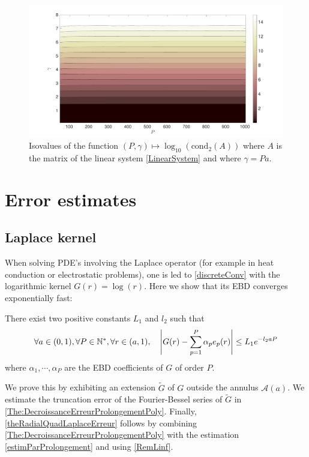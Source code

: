 \documentclass[main]{subfiles}
\begin{document}
\begin{figure}[t]
	\centering\includegraphics[scale = 0.15]{EBD/figs/isoValues-eps-converted-to}
	\caption{Isovalues of the function $(P,\gamma) \mapsto \log_{10} (\text{cond}_2(A))$ where $A$ is the matrix of the linear system \eqref{LinearSystem} and where $\gamma = Pa$. }
	\label{isoValues}
\end{figure}




\section{Error estimates}
\label{sec:ApplicationLaplaceHelmholtz}
\subsection{Laplace kernel}
When solving PDE's involving the Laplace operator (for example in heat conduction or electrostatic problems), one is led to \eqref{discreteConv} with the logarithmic kernel $G(r) = \log(r)$. Here we show that its EBD converges exponentially fast:
\begin{theorem} 
	\label{theRadialQuadLaplaceErreur}
	There exist two positive constants $L_1$ and $l_2$ such that
	\[ \forall a \in (0,1), \forall P \in \mathbb{N}^*, \forall r \in (a,1), \quad \left\lvert G(r) - \sum_{p=1}^P \alpha_p e_p(r) \right\rvert \leq L_1 e^{-l_2 a P} \]
	where $\alpha_1,\cdots,\alpha_P$ are the EBD coefficients of $G$ of order $P$.  
\end{theorem}
We prove this by exhibiting an extension $\tilde{G}$ of $G$ outside the annulus $\mathcal{A}(a)$. We estimate the truncation error of the Fourier-Bessel series of $\tilde{G}$ in \autoref{The:DecroissanceErreurProlongementPoly}. Finally, \autoref{theRadialQuadLaplaceErreur} follows by combining \autoref{The:DecroissanceErreurProlongementPoly} with the estimation \eqref{estimParProlongement} and using \autoref{RemLinf}.
\end{document}
